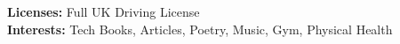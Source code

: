 
{\fontsize{10pt}{12pt}\selectfont\color{black}\calibrifont
\textbf{Licenses:}      Full UK Driving License \\
\textbf{Interests:}     Tech Books, Articles, Poetry, Music, Gym, Physical Health
}
